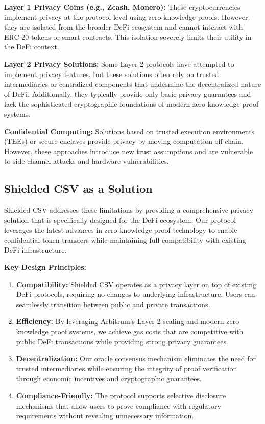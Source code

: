 \documentclass[11pt,a4paper]{article}
\begin{document}
\textbf{Layer 1 Privacy Coins (e.g., Zcash, Monero):} These cryptocurrencies implement privacy at the protocol level using zero-knowledge proofs. However, they are isolated from the broader DeFi ecosystem and cannot interact with ERC-20 tokens or smart contracts. This isolation severely limits their utility in the DeFi context.

\textbf{Layer 2 Privacy Solutions:} Some Layer 2 protocols have attempted to implement privacy features, but these solutions often rely on trusted intermediaries or centralized components that undermine the decentralized nature of DeFi. Additionally, they typically provide only basic privacy guarantees and lack the sophisticated cryptographic foundations of modern zero-knowledge proof systems.

\textbf{Confidential Computing:} Solutions based on trusted execution environments (TEEs) or secure enclaves provide privacy by moving computation off-chain. However, these approaches introduce new trust assumptions and are vulnerable to side-channel attacks and hardware vulnerabilities.

\subsection{Shielded CSV as a Solution}

Shielded CSV addresses these limitations by providing a comprehensive privacy solution that is specifically designed for the DeFi ecosystem. Our protocol leverages the latest advances in zero-knowledge proof technology to enable confidential token transfers while maintaining full compatibility with existing DeFi infrastructure.

\textbf{Key Design Principles:}

\begin{enumerate}
    \item \textbf{Compatibility:} Shielded CSV operates as a privacy layer on top of existing DeFi protocols, requiring no changes to underlying infrastructure. Users can seamlessly transition between public and private transactions.
    
    \item \textbf{Efficiency:} By leveraging Arbitrum's Layer 2 scaling and modern zero-knowledge proof systems, we achieve gas costs that are competitive with public DeFi transactions while providing strong privacy guarantees.
    
    \item \textbf{Decentralization:} Our oracle consensus mechanism eliminates the need for trusted intermediaries while ensuring the integrity of proof verification through economic incentives and cryptographic guarantees.
    
    \item \textbf{Compliance-Friendly:} The protocol supports selective disclosure mechanisms that allow users to prove compliance with regulatory requirements without revealing unnecessary information.
\end{enumerate}
\end{document}
